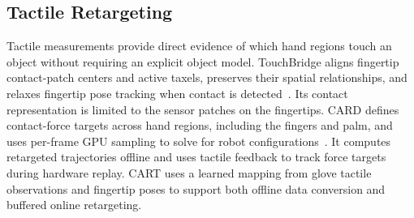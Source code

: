 \subsection{Tactile Retargeting}
Tactile measurements provide direct evidence of which hand regions touch an object without requiring an explicit object model. TouchBridge aligns fingertip contact-patch centers and active taxels, preserves their spatial relationships, and relaxes fingertip pose tracking when contact is detected~\cite{zhang2026touchbridge}. Its contact representation is limited to the sensor patches on the fingertips. CARD defines contact-force targets across hand regions, including the fingers and palm, and uses per-frame GPU sampling to solve for robot configurations~\cite{dai2026card}. It computes retargeted trajectories offline and uses tactile feedback to track force targets during hardware replay. CART uses a learned mapping from glove tactile observations and fingertip poses to support both offline data conversion and buffered online retargeting.
